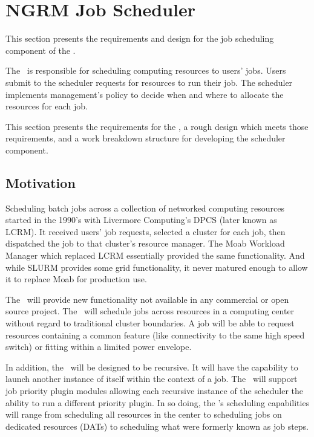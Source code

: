\section{NGRM Job Scheduler}

This section presents the requirements and design for the job
scheduling component of the \ngrm.

The \ngjs\ is responsible for scheduling computing resources to users'
jobs.  Users submit to the scheduler requests for resources to run
their job.  The scheduler implements management's policy to decide
when and where to allocate the resources for each job.

This section presents the requirements for the \ngjs, a rough design
which meets those requirements, and a work breakdown structure for
developing the scheduler component.

\subsection{Motivation}

Scheduling batch jobs across a collection of networked computing
resources started in the 1990's with Livermore Computing's DPCS (later
known as LCRM).  It received users' job requests, selected a cluster
for each job, then dispatched the job to that cluster's resource
manager.  The Moab Workload Manager which replaced LCRM essentially
provided the same functionality.  And while SLURM provides some grid
functionality, it never matured enough to allow it to replace Moab for
production use.

The \ngjs\ will provide new functionality not available in any
commercial or open source project.  The \ngjs\ will schedule jobs
across resources in a computing center without regard to traditional
cluster boundaries.  A job will be able to request resources
containing a common feature (like connectivity to the same high speed
switch) or fitting within a limited power envelope.

In addition, the \ngjs\ will be designed to be recursive.  It will
have the capability to launch another instance of itself within the
context of a job.  The \ngjs\ will support job priority plugin modules
allowing each recursive instance of the scheduler the ability to run a
different priority plugin.  In so doing, the \ngjs's scheduling
capabilities will range from scheduling all resources in the center to
scheduling jobs on dedicated resources (DATs) to scheduling what were
formerly known as job steps.

